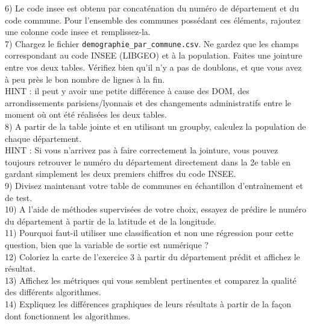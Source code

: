 \documentclass[a4paper]{article}
\begin{document}
6) Le code insee est obtenu par concaténation du numéro de département et du code commune. Pour l'ensemble des communes possédant ces éléments, rajoutez une colonne code insee et remplissez-la.\\

7) Chargez le fichier \texttt{demographie\_par\_commune.csv}. Ne gardez que les champs correspondant au code INSEE (LIBGEO) et à la population. Faites une jointure entre vos deux tables. Vérifiez bien qu'il n'y a pas de doublons, et que vous avez à peu près le bon nombre de lignes à la fin.\\

HINT : il peut y avoir une petite différence à cause des DOM, des arrondissements parisiens/lyonnais et des changements administratifs entre le moment où ont été réalisées les deux tables.\\

8) A partir de la table jointe et en utilisant un groupby, calculez la population de chaque département.\\

HINT : Si vous n'arrivez pas à faire correctement la jointure, vous pouvez toujours retrouver le numéro du département directement dans la 2e table en gardant simplement les deux premiers chiffres du code INSEE.\\

9) Divisez maintenant votre table de communes en échantillon d'entraînement et de test. \\

10) A l'aide de méthodes supervisées de votre choix, essayez de prédire le numéro du département à partir de la latitude et de la longitude.\\

11) Pourquoi faut-il utiliser une classification et non une régression pour cette question, bien que la variable de sortie est numérique ?\\

12) Coloriez la carte de l'exercice 3 à partir du département prédit et affichez le résultat.\\

13) Affichez les métriques qui vous semblent pertinentes et comparez la qualité des différents algorithmes.\\

14) Expliquez les différences graphiques de leurs résultats à partir de la façon dont fonctionnent les algorithmes.
\end{document}

